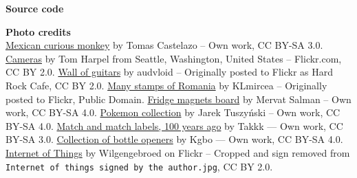 \begin{frame}[t,plain,fragile=singleslide]
\begin{adjustwidth}{15mm}{15mm}
    \textbf{Source code} \\
    \vspace{2mm}

    \textbf{Photo credits} \\
    \href{https://commons.wikimedia.org/w/index.php?curid=12885513}{Mexican
      curious monkey} by Tomas Castelazo -- Own work, CC BY-SA 3.0. %
    \href{https://commons.wikimedia.org/w/index.php?curid=341924}{Cameras}
    by Tom Harpel from Seattle, Washington, United States --
    Flickr.com, CC BY 2.0. %
    \href{https://commons.wikimedia.org/w/index.php?curid=8775841}{Wall
      of guitars} by audvloid -- Originally posted to Flickr as Hard
    Rock Cafe, CC BY 2.0. %
    \href{https://commons.wikimedia.org/w/index.php?curid=8453746}{Many
      stamps of Romania} by KLmircea -- Originally posted to Flickr,
    Public Domain. %
    \href{https://commons.wikimedia.org/w/index.php?curid=53410895}{Fridge
      magnets board} by Mervat Salman -- Own work, CC BY-SA 4.0. %
    \href{https://commons.wikimedia.org/w/index.php?curid=41239841}{Pokemon
      collection} by Jarek Tuszyński -- Own work, CC BY-SA 4.0. %
    \href{https://commons.wikimedia.org/w/index.php?curid=10076345}{Match
      and match labels, 100 years ago} by Takkk — Own work, CC BY-SA
    3.0. %
    \href{https://commons.wikimedia.org/w/index.php?curid=51338181}{Collection
      of bottle openers} by Kgbo — Own work, CC BY-SA 4.0. %
    \href{https://commons.wikimedia.org/w/index.php?curid=32745645}{Internet
      of Things} by Wilgengebroed on Flickr -- Cropped and sign
    removed from \texttt{Internet of things signed by the author.jpg},
    CC BY 2.0.
  \end{adjustwidth}
\end{frame}

